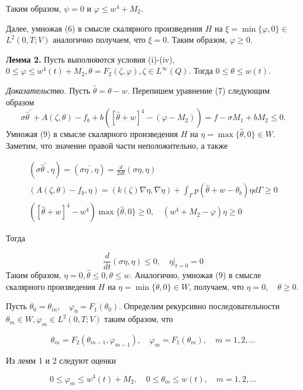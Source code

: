 Таким образом, $\psi=0$ и $\varphi \leq w^{4}+M_{2}$.

Далее, умножая (6) в смысле скалярного произведения $H$ на $\xi=\min \{\varphi, 0\} \in$ $L^{2}(0, T ; V) $ аналогично получаем, что $\xi=0$. Таким образом, $\varphi\geq 0$.

\textbf{Лемма 2.}
Пусть выполняются условия (i)-(iv), $0 \leq \varphi \leq w^{4}(t)+M_{2}, \theta=F_{2}(\zeta, \varphi) , \zeta \in L^{\infty}(Q)$. Тогда $0 \leq \theta \leq w(t)$.

\textit{Доказательство.}
Пусть $\widehat{\theta}=\theta-w$. Перепишем уравнение (7) следующим образом
$$
\sigma \widehat{\theta}^{\prime}+A(\zeta, \theta)
-f_{b}+b\left([\widehat{\theta}+w]^{4}-\left(\varphi-M_{2}\right)\right)=f-\sigma M_{1}+b M_{2} \leq 0.
$$
Умножая (9) в смысле скалярного произведения $H$ на $\eta=\max \{\widehat{\theta}, 0\} \in W$.
Заметим, что значение правой части неположительно, а также

$$
\begin{gathered}
    \left(\sigma \widehat{\theta}^{\prime}, \eta\right)=\left(\sigma \eta^{\prime}, \eta\right)=\frac{d}{2 d t}(\sigma \eta, \eta) \\
    \left(A(\zeta, \theta)-f_{b}, \eta\right)=(k(\zeta) \nabla \eta, \nabla \eta)+\int_{\Gamma} p\left(\widehat{\theta}+w-\theta_{b}\right) \eta d \Gamma \geq 0 \\
    \left([\widehat{\theta}+w]^{4}-w^{4}\right) \max \{\widehat{\theta}, 0\} \geq 0, \quad\left(w^{4}+M_{2}-\varphi\right) \eta \geq 0
\end{gathered}
$$

Тогда

$$
\frac{d}{d t}(\sigma \eta, \eta) \leq 0,\left.\quad \eta\right|_{t=0}=0
$$
Таким образом, $\eta=0, \widehat{\theta} \leq 0, \theta \leq w$. Аналогично, умножая (9) в смысле скалярного произведения $H$ на $\eta=\min \{\theta, 0\} \in W$, получаем, что $\eta=0, \quad \theta \geq 0$.

Пусть $\theta_{0}=\theta_{i n}, \quad \varphi_{0}=F_{1}\left(\theta_{0}\right)$.
Определим рекурсивно последовательности $\theta_{m} \in W, \varphi_{m} \in L^{2}(0, T ; V)$ таким образом, что

$$
\theta_{m}=F_{2}\left(\theta_{m-1}, \varphi_{m-1}\right),
\quad \varphi_{m}=F_{1}\left(\theta_{m}\right), \quad m=1,2, \ldots
$$


Из лемм 1 и 2 следуют оценки

$$
0 \leq \varphi_{m} \leq w^{4}(t)+M_{2}, \quad 0 \leq \theta_{m} \leq w(t), \quad m=1,2, \ldots
$$

